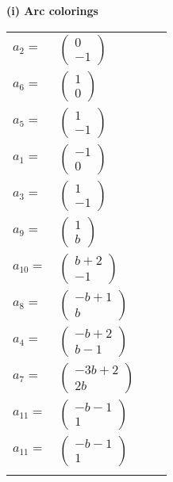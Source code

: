 \documentclass[1p]{elsarticle_modified}
\theoremstyle{definition}
\begin{document}
\flushleft \textbf{(i) Arc colorings}\\
\begin{tabular}{m{7pt} m{180pt} m{7pt} m{180pt} }
\flushright $a_{2}=$&$\begin{pmatrix}0\\-1\end{pmatrix}$ \\
\flushright $a_{6}=$&$\begin{pmatrix}1\\0\end{pmatrix}$ \\
\flushright $a_{5}=$&$\begin{pmatrix}1\\-1\end{pmatrix}$ \\
\flushright $a_{1}=$&$\begin{pmatrix}-1\\0\end{pmatrix}$ \\
\flushright $a_{3}=$&$\begin{pmatrix}1\\-1\end{pmatrix}$ \\
\flushright $a_{9}=$&$\begin{pmatrix}1\\b\end{pmatrix}$ \\
\flushright $a_{10}=$&$\begin{pmatrix}b+2\\-1\end{pmatrix}$ \\
\flushright $a_{8}=$&$\begin{pmatrix}- b+1\\b\end{pmatrix}$ \\
\flushright $a_{4}=$&$\begin{pmatrix}- b+2\\b-1\end{pmatrix}$ \\
\flushright $a_{7}=$&$\begin{pmatrix}-3 b+2\\2 b\end{pmatrix}$ \\
\flushright $a_{11}=$&$\begin{pmatrix}- b-1\\1\end{pmatrix}$\\ \flushright $a_{11}=$&$\begin{pmatrix}- b-1\\1\end{pmatrix}$\\&\end{tabular}
\end{document}

